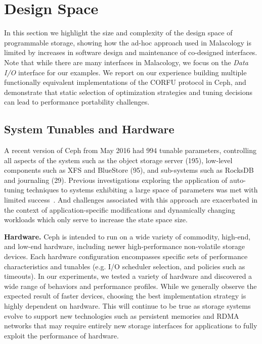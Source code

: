 \section{Design Space}
\label{sec:dspace}

In this section we highlight the size and complexity of the design space of
programmable storage, showing how the ad-hoc approach used in Malacology is
limited by increases in software design and maintenance of co-designed
interfaces. Note that while there are many interfaces in Malacology, we focus
on the \emph{Data I/O} interface for our examples. We report on our experience
building multiple functionally equivalent implementations of the CORFU protocol
in Ceph, and demonstrate that static selection of optimization strategies and
tuning decisions can lead to performance portability challenges.

\subsection{System Tunables and Hardware}

A recent version of Ceph from May 2016 had 994 tunable parameters, controlling
all aspects of the system such as the object storage server (195), low-level
components such as XFS and BlueStore (95), and sub-systems such as RocksDB and
journaling (29). Previous investigations exploring the application of
auto-tuning techniques to systems exhibiting a large space of parameters was
met with limited success~\cite{behzad:sc2013-autotuning}. And challenges
associated with this approach are exacerbated in the context of
application-specific modifications and dynamically changing workloads which
only serve to increase the state space size.

{\bf Hardware.} Ceph is intended to run on a wide variety of commodity,
high-end, and low-end hardware, including newer high-performance non-volatile
storage devices. Each hardware configuration encompasses specific sets of
performance characteristics and tunables (e.g. I/O scheduler selection, and
policies such as timeouts). In our experiments, we tested a variety of
hardware and discovered a wide range of behaviors and performance profiles.
While we generally observe the expected result of faster devices, choosing the
best implementation strategy is highly dependent on hardware. This will
continue to be true as storage systems evolve to support new technologies such as
persistent memories and RDMA networks that may require entirely new storage
interfaces for applications to fully exploit the performance of hardware.

